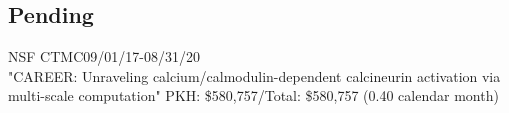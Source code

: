 \subsection{Pending}




NSF CTMC\dapi \hfill 09/01/17-08/31/20 \\
"CAREER: Unraveling calcium/calmodulin-dependent calcineurin activation via multi-scale computation"
%
PKH: \$580,757/Total: \$580,757 (0.40 calendar month)

